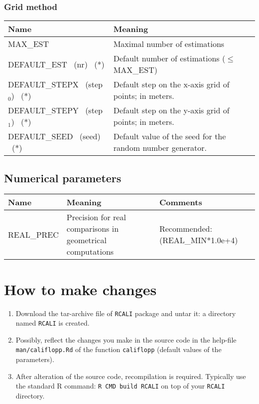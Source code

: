 \subsection{Grid method}
\begin{tabular}[h]{|p{5cm}|p{9cm}|}
\hline
\textbf{Name} & \textbf{Meaning}   \\ \hline
 MAX\_EST
 & Maximal number of estimations
 \\ \hline
 DEFAULT\_EST \mbox{ (nr)} \mbox{ (*)}
 & 
Default number of estimations ($\leq$ MAX\_EST)
 \\ \hline
 DEFAULT\_STEPX \mbox{ (step$_0$)} \mbox{ (*)}
 & Default step on the x-axis  grid of points; in meters.
 \\ \hline
 DEFAULT\_STEPY \mbox{ (step$_1$)} \mbox{ (*)}
 & Default  step on the y-axis grid of points; in meters.
 \\ \hline
  DEFAULT\_SEED  \mbox{ (seed)} \mbox{ (*)}
 &  Default value of the seed  for the random number generator.  \\ \hline
\end{tabular}

\section{Numerical  parameters}
\begin{tabular}[h]{|p{4cm}|p{5cm}|p{5cm}|}
\hline
\textbf{Name} & \textbf{Meaning} & \textbf{Comments} \\ \hline
 REAL\_PREC
 & 
Precision for real comparisons in geometrical computations
 & 
Recommended: (REAL\_MIN*1.0e+4)
\\ \hline
\end{tabular}



\chapter{How to make changes}
\label{howchanges}
\begin{enumerate}
\item
Download the tar-archive file of \verb+RCALI+ package and untar it:
a directory named \texttt{RCALI} is created.
\item
Possibly, reflect the changes you make in the source code 
in the help-file \texttt{man/califlopp.Rd} of the function \texttt{califlopp} (default values
of the parameters).
\item 
After alteration of the source code, recompilation is required.
Typically use the standard R command: \texttt{R CMD build RCALI}
on top of your \texttt{RCALI} directory.
\end{enumerate}
